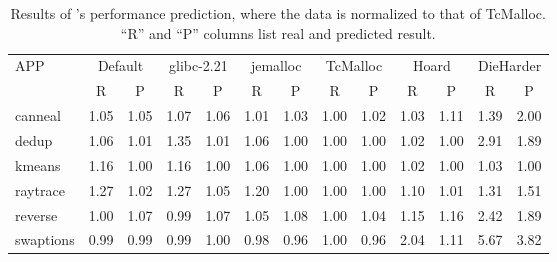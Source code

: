 \begin{table}[]
  \centering
  \footnotesize
  \setlength{\tabcolsep}{0.2em}
\begin{tabular}{l|c|c|c|c|c|c|c|c|c|c|c|c}
\hline
 \multirow{2}{*}{APP} &
  \multicolumn{2}{c|}{Default} &
  \multicolumn{2}{c|}{glibc-2.21} &
  \multicolumn{2}{c|}{jemalloc} &
  \multicolumn{2}{c|}{TcMalloc} &
  \multicolumn{2}{c|}{Hoard} &
  \multicolumn{2}{c}{DieHarder} \\ \cline{2-13}
  & R & P & R & P & R & P & R & P & R & P  & R & P    \\ \hline
canneal        & 1.05 & 1.05 & 1.07 & 1.06 & 1.01 & 1.03 & 1.00 & 1.02 & 1.03 & 1.11 & 1.39 & 2.00 \\ \hline
dedup          & 1.06 & 1.01 & 1.35 & 1.01 & 1.06 & 1.00 & 1.00 & 1.00 & 1.02 & 1.00 & 2.91 & 1.89 \\ \hline
kmeans         & 1.16 & 1.00 & 1.16 & 1.00 & 1.06 & 1.00 & 1.00 & 1.00 & 1.02 & 1.00 & 1.03 & 1.00 \\ \hline
raytrace       & 1.27 & 1.02 & 1.27 & 1.05 & 1.20 & 1.00 & 1.00 & 1.00 & 1.10 & 1.01 & 1.31 & 1.51 \\ \hline
reverse & 1.00 & 1.07 & 0.99 & 1.07 & 1.05 & 1.08 & 1.00 & 1.04 & 1.15 & 1.16 & 2.42 & 1.89 \\ \hline
swaptions      & 0.99 & 0.99 & 0.99 & 1.00 & 0.98 & 0.96 & 1.00 & 0.96 & 2.04 & 1.11 & 5.67 & 3.82 \\ \hline
\end{tabular}
   \caption{ Results of \MP{}'s performance prediction, where the data is normalized to that of TcMalloc. ``R'' and ``P'' columns list real and predicted result.  \label{tbl:predictionResult}}
\end{table}

